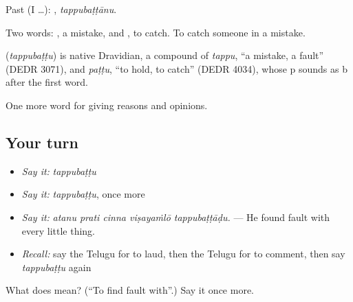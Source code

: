 Past (I …): , \emph{tappubaṭṭānu}.

Two words: , a mistake, and , to catch. To catch someone in a mistake.

\begin{cousinweb}
\textbf{} (\emph{tappubaṭṭu}) is native Dravidian, a compound of \emph{tappu}, \textquotedblleft{}a mistake, a fault\textquotedblright{} (DEDR 3071), and \emph{paṭṭu}, \textquotedblleft{}to hold, to catch\textquotedblright{} (DEDR 4034), whose p sounds as b after the first word.
\end{cousinweb}

\begin{grammarlens}[title={What you've built}]
One more word for giving reasons and opinions.
\end{grammarlens}

\subsection*{Your turn}
\begin{itemize}
\raggedright
  \item \emph{Say it:} \emph{tappubaṭṭu}
  \item \emph{Say it:} \emph{tappubaṭṭu}, once more
  \item \emph{Say it:} \emph{atanu prati cinna viṣayaṁlō tappubaṭṭāḍu.} — He found fault with every little thing.
  \item \emph{Recall:} say the Telugu for to laud, then the Telugu for to comment, then say \emph{tappubaṭṭu} again
\end{itemize}

\begin{tcolorbox}[breakable,colback=teal!4,colframe=teal!35!black,title={Before you move on}]
What does  mean? (\textquotedblleft{}To find fault with\textquotedblright{}.) Say it once more.
\end{tcolorbox}

